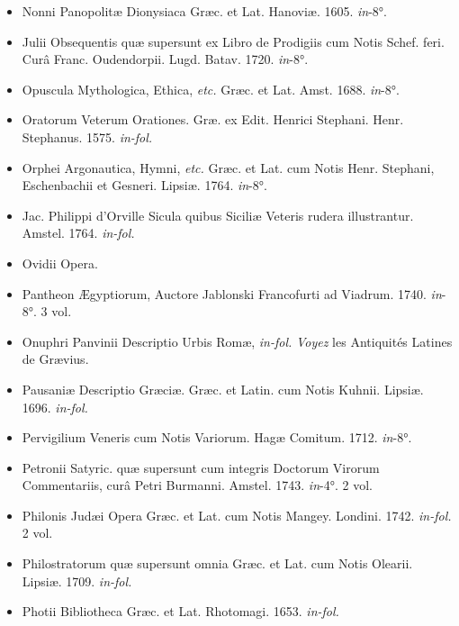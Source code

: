 \documentclass[a4paper, 18pt, oneside]{article}
\begin{document}
\begin{itemize}
    \item Nonni Panopolitæ Dionysiaca Græc. et Lat. Hanoviæ. 1605. \emph{in}-8°.

    \item Julii Obsequentis quæ supersunt ex Libro de Prodigiis cum Notis Schef. feri. Curâ Franc. Oudendorpii. Lugd. Batav. 1720. \emph{in}-8°.

    \item Opuscula Mythologica, Ethica, \emph{etc.} Græc. et Lat. Amst. 1688. \emph{in}-8°.

    \item Oratorum Veterum Orationes. Græ. ex Edit. Henrici Stephani. Henr. Stephanus. 1575. \emph{in-fol.}

    \item Orphei Argonautica, Hymni, \emph{etc.} Græc. et Lat. cum Notis Henr. Stephani, Eschenbachii et Gesneri. Lipsiæ. 1764. \emph{in}-8°.

    \item Jac. Philippi d'Orville Sicula quibus Siciliæ Veteris rudera illustrantur. Amstel. 1764. \emph{in-fol.}

    \item Ovidii Opera.

    \item Pantheon Ægyptiorum, Auctore Jablonski Francofurti ad Viadrum. 1740. \emph{in}-8°. 3 vol.

    \item Onuphri Panvinii Descriptio Urbis Romæ, \emph{in-fol.} \emph{Voyez} les Antiquités Latines de Grævius.

    \item Pausaniæ Descriptio Græciæ. Græc. et Latin. cum Notis Kuhnii. Lipsiæ. 1696. \emph{in-fol.}

    \item Pervigilium Veneris cum Notis Variorum. Hagæ Comitum. 1712. \emph{in}-8°.

    \item Petronii Satyric. quæ supersunt cum integris Doctorum Virorum Commentariis, curâ Petri Burmanni. Amstel. 1743. \emph{in}-4°. 2 vol.

    \item Philonis Judæi Opera Græc. et Lat. cum Notis Mangey. Londini. 1742. \emph{in-fol.} 2 vol.

    \item Philostratorum quæ supersunt omnia Græc. et Lat. cum Notis Olearii. Lipsiæ. 1709. \emph{in-fol.}

    \item Photii Bibliotheca Græc. et Lat. Rhotomagi. 1653. \emph{in-fol.}


\end{itemize}
\end{document}
